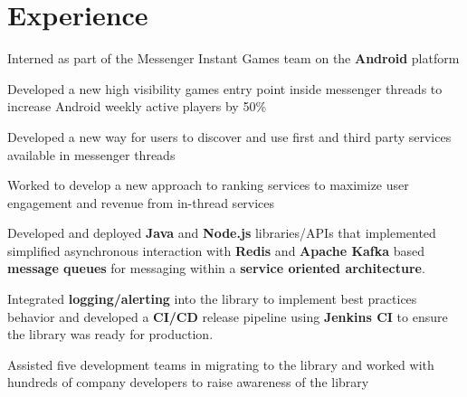 \documentclass[letterpaper]{deedy-resume} %
\begin{document}
\hfill
%
%
\begin{minipage}[t]{0.66\textwidth} %


\section{Experience}


\vspace{\topsep} %
\begin{tightitemize}
\item Interned as part of the Messenger Instant Games team on the {\bf Android} platform
\item Developed a new high visibility games entry point inside messenger threads to
increase Android weekly active players by 50\%
\item Developed a new way for users to discover and use first and third party services available in messenger threads
\item Worked to develop a new approach to ranking services to maximize user engagement and revenue from in-thread services
\end{tightitemize}

\sectionspace %



\begin{tightitemize}
\item Developed and deployed {\bf Java}  and {\bf Node.js} libraries/APIs that implemented simplified asynchronous interaction with {\bf Redis} and {\bf Apache Kafka} based {\bf message queues} for messaging within a {\bf service oriented architecture}.
\item Integrated {\bf logging/alerting} into the library to implement best practices behavior and developed a {\bf CI/CD} release pipeline using {\bf Jenkins CI} to ensure the library was ready for production.
\item Assisted five development teams in migrating to the library and worked with hundreds of company developers to raise awareness of the library
\end{tightitemize}


\end{minipage}
\end{document}
